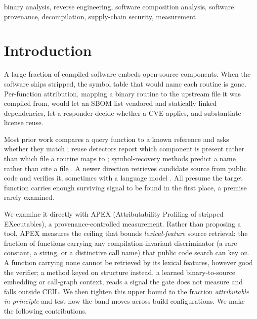 \documentclass[conference]{IEEEtran}
\begin{document}
\begin{IEEEkeywords}
binary analysis, reverse engineering, software composition analysis, software
provenance, decompilation, supply-chain security, measurement
\end{IEEEkeywords}

\section{Introduction}
A large fraction of compiled software embeds open-source components. When the
software ships stripped, the symbol table that would name each routine is gone.
Per-function attribution, mapping a binary routine to the upstream file it was compiled
from, would let an SBOM list vendored and statically linked dependencies, let a
responder decide whether a CVE applies, and substantiate license reuse.

Most prior work compares a query function to a known reference and asks whether
they match \cite{genius,gemini,safe,jtrans,trex,asm2vec}; reuse detectors report
which component is present rather than which file a routine maps to
\cite{bat,osspolice,b2sfinder,centris}; symbol-recovery methods predict a name
rather than cite a file \cite{debin,punstrip,symlm,dirty}. A newer direction
retrieves candidate source from public code and verifies it, sometimes with a
language model \cite{binaryai,llm4decompile}. All presume the target function carries enough
surviving signal to be found in the first place, a premise rarely examined.

We examine it directly with APEX (Attributability Profiling of stripped
EXecutables), a provenance-controlled measurement. Rather than proposing a tool, APEX
measures the ceiling that bounds \emph{lexical-feature} source retrieval: the fraction
of functions carrying any compilation-invariant discriminator (a rare constant, a
string, or a distinctive call name) that public code search can key on. A function
carrying none cannot be retrieved by its lexical features, however good the verifier; a
method keyed on structure instead, a learned binary-to-source embedding or call-graph
context, reads a signal the gate does not measure and falls outside CEIL. We then
tighten this upper bound to the fraction \emph{attributable in principle} and test how
the band moves across build configurations. We make the following contributions.
\end{document}
